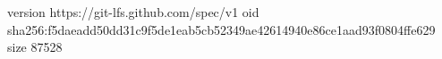 version https://git-lfs.github.com/spec/v1
oid sha256:f5daeadd50dd31c9f5de1eab5cb52349ae42614940e86ce1aad93f0804ffe629
size 87528
